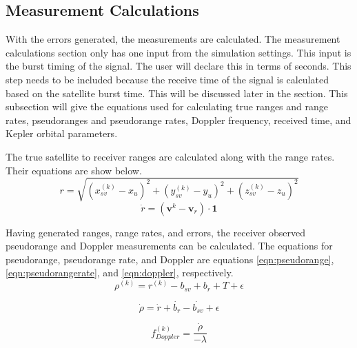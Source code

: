 \documentclass[12pt]{report}
\begin{document}
\subsection{Measurement Calculations}
With the errors generated, the measurements are calculated. The measurement calculations section only has one input from the simulation settings. This input is the burst timing of the signal. The user will declare this in terms of seconds. This step needs to be included because the receive time of the signal is calculated based on the satellite burst time. This will be discussed later in the section. This subsection will give the equations used for calculating true ranges and range rates, pseudoranges and pseudorange rates, Doppler frequency, received time, and Kepler orbital parameters. 

The true satellite to receiver ranges are calculated along with the range rates. Their equations are show below.
\begin{equation}
    r = \sqrt{(x^{(k)}_{sv} - x_u)^2 + (y^{(k)}_{sv} - y_u)^2 + (z^{(k)}_{sv} - z_u)^2}
    \label{eqn:rangeeqn}
\end{equation}
\begin{equation}
    \dot{r} = (\mathbf{v}^{k} - \mathbf{v}_r) \cdot \mathbf{1}
    \label{eqn:rangerate}
\end{equation}

Having generated ranges, range rates, and errors, the receiver observed pseudorange and Doppler measurements can be calculated. The equations for pseudorange, pseudorange rate, and Doppler are equations \ref{eqn:pseudorange}, \ref{eqn:pseudorangerate}, and \ref{eqn:doppler}, respectively.
\begin{equation}
    \rho^{(k)} = r^{(k)} - b_{sv} + b_r + T +\epsilon
    \label{eqn:pseudorange}
\end{equation}

\begin{equation}
    \dot{\rho} = \dot{r} + \dot{b_r} - \dot{b_{sv}} + \epsilon
    \label{eqn:pseudorangerate}
\end{equation}

\begin{equation}
    f^{(k)}_{Doppler} = \frac{\dot{\rho}}{-\lambda}
    \label{eqn:doppler}
\end{equation}
\end{document}
